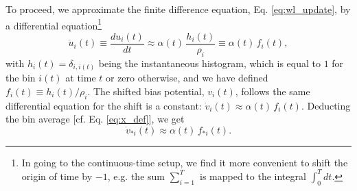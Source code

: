 \documentclass[reprint, superscriptaddress, floatfix]{revtex4-1}
\begin{document}
To proceed, we
approximate the finite difference equation, Eq. \eqref{eq:wl_update},
by a differential equation\footnote{In
going to the continuous-time setup,
we find it more convenient to shift the origin of time by $-1$,
e.g. the sum $\sum_{i=1}^T$ is mapped to the integral $\int_0^T dt$.}
%
\begin{equation}
  \dot u_i(t)
  \equiv
  \frac{ d u_i(t) } { dt }
  \approx
  \alpha(t) \, \frac{ h_i(t) } { \rho_i }
  \equiv
  \alpha(t) \, f_i(t)
  ,
  \label{eq:ut_diffeq}
\end{equation}
%
with
%
$h_i(t) = \delta_{i, i(t)}$
%
being the instantaneous histogram,
which is equal to $1$
for the bin $i(t)$ at time $t$
or zero otherwise,
and we have defined
$f_i(t) \equiv h_i(t) /\rho_i$.
%
The shifted bias potential, $v_i(t)$,
follows the same differential equation
for the shift is a constant:
$\dot v_i(t) \approx \alpha(t) \, f_i(t)$.
%
Deducting the bin average [cf. Eq. \eqref{eq:x_def}],
we get
%
\begin{equation}
  \dot v_{*i}(t)
  \approx
  \alpha(t) \, f_{*i}(t)
  .
  \label{eq:vt_diffeq}
\end{equation}
\end{document}
